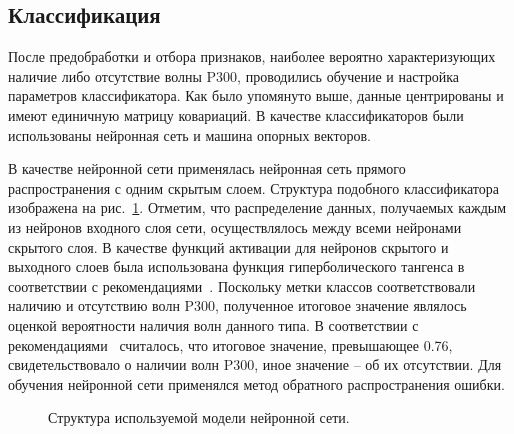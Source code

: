 \documentclass[12pt,a4paper,oneside,fleqn,leqno]{article}
\begin{document}
\subsection{Классификация}
	\par После предобработки и отбора признаков, наиболее вероятно характеризующих наличие либо отсутствие волны P300, проводились обучение и  настройка параметров классификатора. Как было упомянуто выше, данные центрированы и имеют единичную матрицу ковариаций. В качестве классификаторов были использованы нейронная сеть и машина опорных векторов.
	\par В качестве нейронной сети применялась нейронная сеть прямого распространения с одним скрытым слоем. Структура подобного классификатора изображена на рис.~\ref{nn}. Отметим, что распределение данных, получаемых каждым из нейронов входного слоя сети, осуществлялось между всеми нейронами скрытого слоя. В качестве функций активации для нейронов скрытого и выходного слоев была использована функция гиперболического тангенса в соответствии с рекомендациями~\cite{activation}. Поскольку метки классов соответствовали наличию и отсутствию волн P300, полученное итоговое значение являлось оценкой вероятности наличия волн данного типа. В соответствии с рекомендациями~\cite{neu_net} считалось, что итоговое значение, превышающее 0.76, свидетельствовало о наличии волн P300, иное значение -- об их отсутствии. Для обучения нейронной сети применялся метод обратного распространения ошибки.
	\begin{figure}[h!]
		\caption{Структура используемой модели нейронной сети.}
	\label{nn}
	\end{figure}
\end{document}
